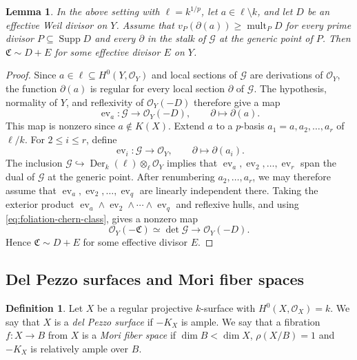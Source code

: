 \documentclass[10pt,abstract=true]{scrartcl}
\numberwithin{equation}{section}
\newtheorem{lemma}[theorem]{Lemma}
\theoremstyle{definition}
\newtheorem{definition}[theorem]{Definition}
\theoremstyle{remark}
\begin{document}
\begin{lemma}\label{lemm:foliation-evaluation}
  In the above setting with $\ell=k^{1/p}$, let $a\in\ell\setminus k$, and let $D$ be an effective Weil divisor on $Y$.
  Assume that $v_P(\partial(a))\geq\operatorname{mult}_PD$ for every prime divisor $P\subseteq\operatorname{Supp}D$ and every $\partial$ in the stalk of $\mathscr G$ at the generic point of $P$.
  Then $\mathfrak C\sim D+E$ for some effective divisor $E$ on $Y$.
\end{lemma}
\begin{proof}
  Since $a\in\ell\subseteq H^0(Y,\mathcal O_Y)$ and local sections of $\mathscr G$ are derivations of $\mathcal O_Y$, the function $\partial(a)$ is regular for every local section $\partial$ of $\mathscr G$.
  The hypothesis, normality of $Y$, and reflexivity of $\mathcal O_Y(-D)$ therefore give a map \cite[Tag~\href{https://stacks.math.columbia.edu/tag/0AVC}{0AVC}]{StacksProject}
  \[
    \operatorname{ev}_a\colon\mathscr G\longrightarrow\mathcal O_Y(-D),
    \qquad \partial\longmapsto\partial(a).
  \]
  This map is nonzero since $a\notin K(X)$.
  Extend $a$ to a $p$-basis $a_1=a,a_2,\ldots,a_r$ of $\ell/k$.
  For $2\leq i\leq r$, define
  \[
    \operatorname{ev}_i\colon\mathscr G\longrightarrow\mathcal O_Y,
    \qquad \partial\longmapsto\partial(a_i).
  \]
  The inclusion $\mathscr G\hookrightarrow\operatorname{Der}_k(\ell)\otimes_\ell\mathcal O_Y$ implies that $\operatorname{ev}_a,\operatorname{ev}_2,\ldots,\operatorname{ev}_r$ span the dual of $\mathscr G$ at the generic point.
  After renumbering $a_2,\ldots,a_r$, we may therefore assume that $\operatorname{ev}_a,\operatorname{ev}_2,\ldots,\operatorname{ev}_q$ are linearly independent there.
  Taking the exterior product $\operatorname{ev}_a\wedge\operatorname{ev}_2\wedge\cdots\wedge\operatorname{ev}_q$ and reflexive hulls, and using \eqref{eq:foliation-chern-class}, gives a nonzero map
  \[
    \mathcal O_Y(-\mathfrak C)\simeq\det\mathscr G
      \longrightarrow\mathcal O_Y(-D).
  \]
  Hence $\mathfrak C\sim D+E$ for some effective divisor $E$.
\end{proof}



\subsection{Del Pezzo surfaces and Mori fiber spaces}\label{sec:del-pezzo-mori-fiber-spaces}%
\begin{definition}
  Let $X$ be a regular projective $k$-surface with $H^0(X,\mathcal O_X) = k$.
  We say that $X$ is a \textit{del Pezzo surface} if $-K_X$ is ample.
  We say that a fibration $f\colon X\to B$ from $X$ is a \textit{Mori fiber space} if $\dim B< \dim X$, $\rho(X/B) = 1$ and $- K_X$ is relatively ample over $B$.
\end{definition}
\end{document}
